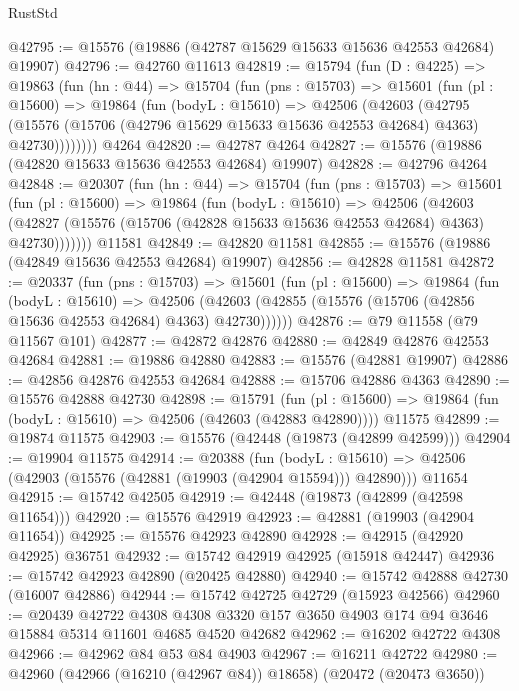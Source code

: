 \begin{lexlean}{RustStd}
\begin{coremodule}
@42795 := @15576 (@19886 (@42787 @15629 @15633 @15636 @42553 @42684) @19907)
@42796 := @42760 @11613
@42819 := @15794
    (fun (D : @4225) =>
    @19863
      (fun (hn : @44) =>
      @15704
        (fun (pns : @15703) =>
        @15601
          (fun (pl : @15600) =>
          @19864
            (fun (bodyL : @15610) =>
            @42506
              (@42603
                (@42795
                  (@15576 (@15706 (@42796 @15629 @15633 @15636 @42553 @42684) @4363) @42730))))))))
    @4264
@42820 := @42787 @4264
@42827 := @15576 (@19886 (@42820 @15633 @15636 @42553 @42684) @19907)
@42828 := @42796 @4264
@42848 := @20307
    (fun (hn : @44) =>
    @15704
      (fun (pns : @15703) =>
      @15601
        (fun (pl : @15600) =>
        @19864
          (fun (bodyL : @15610) =>
          @42506
            (@42603
              (@42827 (@15576 (@15706 (@42828 @15633 @15636 @42553 @42684) @4363) @42730)))))))
    @11581
@42849 := @42820 @11581
@42855 := @15576 (@19886 (@42849 @15636 @42553 @42684) @19907)
@42856 := @42828 @11581
@42872 := @20337
    (fun (pns : @15703) =>
    @15601
      (fun (pl : @15600) =>
      @19864
        (fun (bodyL : @15610) =>
        @42506 (@42603 (@42855 (@15576 (@15706 (@42856 @15636 @42553 @42684) @4363) @42730))))))
@42876 := @79 @11558 (@79 @11567 @101)
@42877 := @42872 @42876
@42880 := @42849 @42876 @42553 @42684
@42881 := @19886 @42880
@42883 := @15576 (@42881 @19907)
@42886 := @42856 @42876 @42553 @42684
@42888 := @15706 @42886 @4363
@42890 := @15576 @42888 @42730
@42898 := @15791
    (fun (pl : @15600) => @19864 (fun (bodyL : @15610) => @42506 (@42603 (@42883 @42890))))
    @11575
@42899 := @19874 @11575
@42903 := @15576 (@42448 (@19873 (@42899 @42599)))
@42904 := @19904 @11575
@42914 := @20388
    (fun (bodyL : @15610) => @42506 (@42903 (@15576 (@42881 (@19903 (@42904 @15594))) @42890)))
    @11654
@42915 := @15742 @42505
@42919 := @42448 (@19873 (@42899 (@42598 @11654)))
@42920 := @15576 @42919
@42923 := @42881 (@19903 (@42904 @11654))
@42925 := @15576 @42923 @42890
@42928 := @42915 (@42920 @42925) @36751
@42932 := @15742 @42919 @42925 (@15918 @42447)
@42936 := @15742 @42923 @42890 (@20425 @42880)
@42940 := @15742 @42888 @42730 (@16007 @42886)
@42944 := @15742 @42725 @42729 (@15923 @42566)
@42960 := @20439
    @42722
    @4308
    @4308
    @3320
    @157
    @3650
    @4903
    @174
    @94
    @3646
    @15884
    @5314
    @11601
    @4685
    @4520
    @42682
@42962 := @16202 @42722 @4308
@42966 := @42962 @84 @53 @84 @4903
@42967 := @16211 @42722
@42980 := @42960
    (@42966 (@16210 (@42967 @84)) @18658)
    (@20472 (@20473 @3650))

\end{coremodule}
\end{lexlean}
